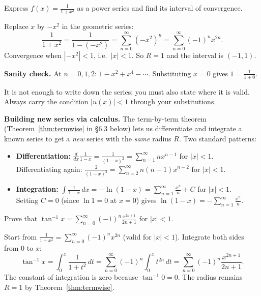 \begin{examplebox}[title={Worked Example: substituting $u=-x^2$ (Lecture Ex.~6.6)}]
Express $\displaystyle f(x)=\frac{1}{1+x^2}$ as a power series and find its interval of convergence.

\smallskip
Replace $x$ by $-x^2$ in the geometric series:
\[
\frac{1}{1+x^2}=\frac{1}{1-(-x^2)}=\sum_{n=0}^{\infty}(-x^2)^n
=\sum_{n=0}^{\infty}(-1)^n x^{2n}.
\]
Convergence when $|-x^2|<1$, i.e.\ $|x|<1$. So $R=1$ and the interval is $(-1,1)$.

\smallskip
\textbf{Sanity check.}
At $n=0,1,2$: $1-x^2+x^4-\cdots$. Substituting $x=0$ gives $1=\frac{1}{1+0}$. \checkmark
\end{examplebox}

\begin{commonmistake}[title={Common Mistake: losing the convergence condition}]
It is not enough to write down the series; you must also state where it is valid.
Always carry the condition $|u(x)|<1$ through your substitutions.
\end{commonmistake}

\noindent\textbf{Building new series via calculus.}
The term-by-term theorem (Theorem~\ref{thm:termwise} in \S6.3 below) lets us differentiate and integrate a known series to get a \emph{new} series with the \emph{same} radius $R$.
Two standard patterns:
\begin{itemize}[leftmargin=*]
\item \textbf{Differentiation:} $\frac{d}{dx}\frac{1}{1-x}=\frac{1}{(1-x)^2}=\sum_{n=1}^{\infty} n x^{n-1}$ for $|x|<1$.\\
Differentiating again: $\frac{2}{(1-x)^3}=\sum_{n=2}^{\infty}n(n-1)x^{n-2}$ for $|x|<1$.
\item \textbf{Integration:} $\int\frac{1}{1-x}\,dx=-\ln(1-x)=\sum_{n=1}^{\infty}\frac{x^n}{n}+C$ for $|x|<1$.\\
Setting $C=0$ (since $\ln 1=0$ at $x=0$) gives $\ln(1-x)=-\sum_{n=1}^{\infty}\frac{x^n}{n}$.
\end{itemize}

\begin{examplebox}[title={Worked Example: $\tan^{-1}x$ via integration (Lecture Ex.~6.10)}]
Prove that $\displaystyle\tan^{-1}x=\sum_{n=0}^{\infty}(-1)^n\frac{x^{2n+1}}{2n+1}$ for $|x|<1$.

\smallskip
Start from
$\frac{1}{1+x^2}=\sum_{n=0}^{\infty}(-1)^n x^{2n}$
(valid for $|x|<1$).
Integrate both sides from $0$ to $x$:
\[
\tan^{-1}x=\int_0^x \frac{1}{1+t^2}\,dt
=\sum_{n=0}^{\infty}(-1)^n\int_0^x t^{2n}\,dt
=\sum_{n=0}^{\infty}(-1)^n\frac{x^{2n+1}}{2n+1}.
\]
The constant of integration is zero because $\tan^{-1}0=0$.
The radius remains $R=1$ by Theorem~\ref{thm:termwise}.
\end{examplebox}

